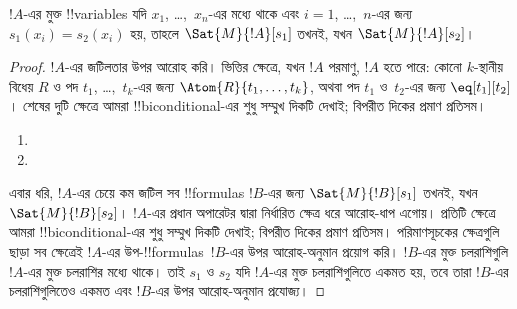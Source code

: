 \documentclass[../../../include/open-logic-section]{subfiles}
\begin{document}
\begin{prop}
$!A$-এর মুক্ত !!{variable}s যদি $x_1$, \dots,~$x_n$-এর মধ্যে থাকে
এবং $i = 1$, \dots,~$n$-এর জন্য $s_1(x_i) = s_2(x_i)$ হয়, তাহলে
$\Sat{M}{!A}[s_1]$ তখনই, যখন $\Sat{M}{!A}[s_2]$।
\end{prop}

\begin{proof}
$!A$-এর জটিলতার উপর আরোহ করি। ভিত্তির ক্ষেত্রে, যখন $!A$ পরমাণু,
$!A$ হতে পারে:
কোনো $k$-স্থানীয় বিধেয় $R$ ও পদ $t_1$, \dots,~$t_k$-এর জন্য
$\Atom{R}{t_1, \dots, t_k}$, অথবা পদ $t_1$ ও~$t_2$-এর জন্য
$\eq[t_1][t_2]$। শেষের দুটি ক্ষেত্রে আমরা !!{biconditional}-এর শুধু
সম্মুখ দিকটি দেখাই; বিপরীত দিকের প্রমাণ প্রতিসম।

\begin{enumerate}


\item
\item
\end{enumerate}


এবার ধরি, $!A$-এর চেয়ে কম জটিল সব !!{formula}s $!B$-এর জন্য
$\Sat{M}{!B}[s_1]$ তখনই, যখন $\Sat{M}{!B}[s_2]$। $!A$-এর প্রধান
অপারেটর দ্বারা নির্ধারিত ক্ষেত্র ধরে আরোহ-ধাপ এগোয়। প্রতিটি ক্ষেত্রে
আমরা !!{biconditional}-এর শুধু সম্মুখ দিকটি দেখাই; বিপরীত দিকের প্রমাণ
প্রতিসম। পরিমাণসূচকের ক্ষেত্রগুলি ছাড়া সব ক্ষেত্রেই $!A$-এর
উপ-!!{formula}s~$!B$-এর উপর আরোহ-অনুমান প্রয়োগ করি। $!B$-এর মুক্ত
চলরাশিগুলি $!A$-এর মুক্ত চলরাশির মধ্যে থাকে। তাই $s_1$ ও $s_2$ যদি
$!A$-এর মুক্ত চলরাশিগুলিতে একমত হয়, তবে তারা $!B$-এর চলরাশিগুলিতেও
একমত এবং $!B$-এর উপর আরোহ-অনুমান প্রযোজ্য।


\end{proof}
\end{document}

